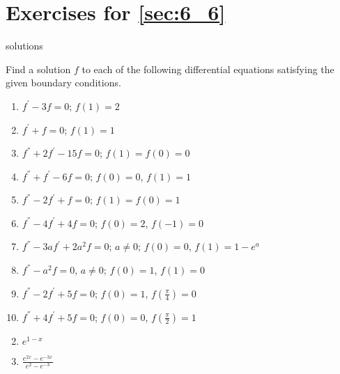 \section*{Exercises for \ref{sec:6_6}}

\begin{Filesave}{solutions}
\end{Filesave}

\begin{multicols}{2}
\begin{ex}
Find a solution $f$ to each of the following differential equations satisfying the given boundary conditions.

\begin{enumerate}[label={\alph*.}]
\item $f^\prime - 3f = 0$; $f(1) = 2$

\item $f^\prime + f = 0$; $f(1) = 1$

\item $f^\dprime + 2f^\prime - 15f = 0$; $f(1) = f(0) = 0$

\item $f^\dprime + f^\prime - 6f = 0$; $f(0) = 0$, $f(1) = 1$

\item $f^\dprime - 2f^\prime + f = 0$; $f(1) = f(0) = 1$

\item $f^\dprime - 4f^\prime + 4f = 0$; $f(0) = 2$, $f(-1) = 0$

\item $f^\dprime - 3af^\prime + 2a^{2}f = 0$; $a \neq 0$; $f(0) = 0$, \newline $f(1) = 1 - e^{a}$

\item $f^\dprime - a^{2}f = 0$, $a \neq 0$; $f(0) = 1$, $f(1) = 0$

\item $f^\dprime - 2f^\prime + 5f = 0$; $f(0) = 1$, $f(\frac{\pi}{4}) = 0$

\item $f^\dprime + 4f^\prime + 5f = 0$; $f(0) = 0$, $f(\frac{\pi}{2}) = 1$

\end{enumerate}
\begin{sol}
\begin{enumerate}[label={\alph*.}]
\setcounter{enumi}{1}
\item  $e^{1 - x}$

\setcounter{enumi}{3}
\item  $\frac{e^{2x} - e^{-3x}}{e^2 - e^{-3}}$


\end{enumerate}
\end{sol}
\end{ex}
\end{multicols}
